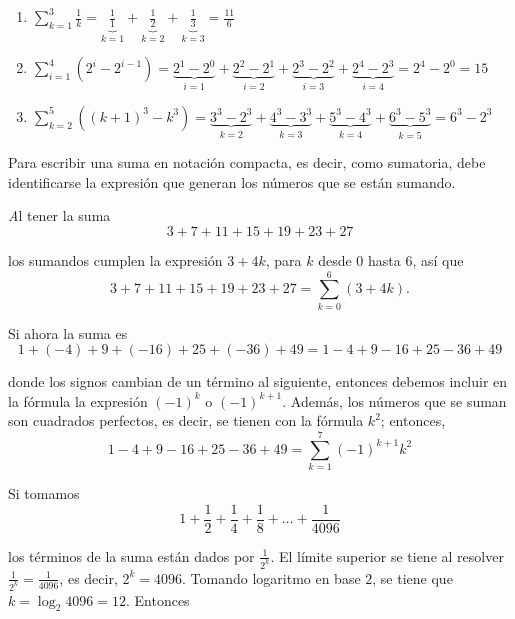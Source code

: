 \begin{ejemplo}
\begin{enumerate}[leftmargin=1.2em, itemindent=0pt, labelwidth=\labelwidth, labelsep=0.5em,]
\item $\displaystyle{\sum_{k=1}^3\frac{1}{k}}=
 \underset{k=1}{\underbrace{\frac{1}{1}}}+
 \underset{k=2}{\underbrace{\frac{1}{2}}}+
 \underset{k=3}{\underbrace{\frac{1}{3}}}=\frac{11}{6}$

\item $\displaystyle{\sum_{i=1}^4 }\left( 2^{i}-2^{i-1}\right) =\underset{i=1}{\underbrace{2^{1}-2^{0}}}+
 \underset{i=2}{\underbrace{2^{2}-2^{1}}}+
 \underset{i=3}{\underbrace{2^{3}-2^{2}}}+
 \underset{i=4}{\underbrace{2^{4}-2^{3}}}=2^{4}-2^{0}=15$

\item $\displaystyle{\sum_{k=2}^5 }\left( \left( k+1\right)
^{3}-k^{3}\right) =\underset{k=2}{\underbrace{3^{3}-2^{3}}}+
\underset{k=3}{\underbrace{4^{3}-3^{3}}}+
\underset{k=4}{\underbrace{5^{3}-4^{3}}}+
\underset{k=5}{\underbrace{6^{3}-5^{3}}}=6^{3}-2^{3}$
\end{enumerate}
\end{ejemplo}

Para escribir una suma en notación compacta, es decir, como sumatoria, debe identificarse la expresión que generan los números que se están sumando.

\begin{ejemplo}
\textit Al tener la suma
\[
3+7+11+15+19+23+27
\]
\end{ejemplo}
los sumandos cumplen la expresión $3+4k$, para $k$ desde $0$ hasta $6$, así que
\[
3+7+11+15+19+23+27=\overset{6}{\underset{k=0}{\sum }}\left( 3+4k\right).
\]

\begin{ejemplo}
Si ahora la suma es
\[
1+(-4)+9+(-16)+25+(-36)+49=1-4+9-16+25-36+49
\]
\end{ejemplo}
donde los signos cambian de un término al siguiente, entonces debemos incluir en la fórmula la expresión $(-1)^k$ o $(-1)^{k+1}$. Además, los números que se suman son cuadrados perfectos, es decir, se tienen con la fórmula $k^{2}$; entonces,
\[
1-4+9-16+25-36+49=\overset{7}{\underset{k=1}{\sum }}\left( -1\right)^{k+1}k^{2}
\]

\begin{ejemplo}
Si tomamos
\[
1+\frac{1}{2}+\frac{1}{4}+\frac{1}{8}+\ldots +\frac{1}{4096}
\]
\end{ejemplo}

los términos de la suma están dados por $\frac{1}{2^{k}}$. El límite superior se tiene al resolver $\frac{1}{2^{k}}=\frac{1}{4096}$, es decir, {\small $2^{k}=4096$}. Tomando logaritmo en base $2$, se tiene que {\small $k=\log _{2}4096=12$}. Entonces

